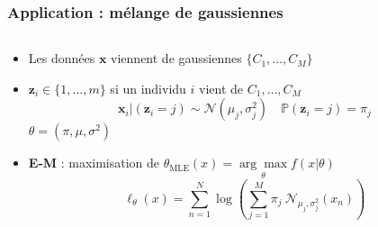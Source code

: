 \begin{frame}

\frametitle{Application : mélange de gaussiennes}

\vspace{-0.5cm}
\begin{columns}
    \begin{column}{0.7\textwidth}
        
        \begin{itemize}
            \item Les données $\mathbf{x}$ viennent de gaussiennes $\{ C_1,\ldots, C_M \}$ 
            \item $\boldsymbol{z}_{i} \in \{1,\ldots, m \}$ si un individu $i$ vient de $C_1, \ldots, C_M$
            $$ 
                \boldsymbol{x}_i |\left(\boldsymbol{z}_{i}=j\right) \sim \mathcal{N}\left(\mu_{j}, \sigma_{j}^{2}\right) \quad \mathbb{P}\left(\boldsymbol{z}_{i}=j\right)=\pi_{j} 
            $$
            $\theta=\left(\pi, \mu, \sigma^{2}\right)$ 
            \item \textbf{E-M} : maximisation de $\hat{\theta}_{\mathrm{MLE}}(x)=\underset{\theta}{\arg \max } f(x | \theta)$\\
            
            $$\ell_{\theta}(x)=\sum_{n=1}^{N} \log \left(\sum_{j=1}^{M} \pi_{j}\ \mathcal{N}_{\mu_{j}, \sigma_{j}^2}\left(x_{n}\right)\right)$$


\end{itemize}
\end{column}
\end{columns}
\end{frame}
